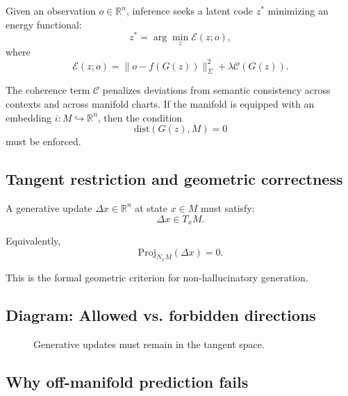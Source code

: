 \documentclass[11pt,a4paper,twocolumn]{article}
\begin{document}
Given an observation $o \in \mathbb{R}^n$, inference seeks a latent code
$z^\ast$ minimizing an energy functional:
\[
z^\ast = \arg\min_z \mathcal{E}(z; o),
\]
where
\[
\mathcal{E}(z; o) = \|o - f(G(z))\|^2_\Sigma
+ \lambda \mathcal{C}(G(z)).
\]

The coherence term $\mathcal{C}$ penalizes deviations from semantic
consistency across contexts and across manifold charts.  
If the manifold is equipped with an embedding $i : M \hookrightarrow
\mathbb{R}^n$, then the condition
\[
\mathrm{dist}(G(z), M) = 0
\]
must be enforced.

\subsection{Tangent restriction and geometric correctness}

A generative update $\Delta x \in \mathbb{R}^n$ at state $x \in M$ must
satisfy:
\[
\Delta x \in T_x M.
\]

Equivalently,
\[
\mathrm{Proj}_{N_x M} (\Delta x) = 0.
\]

This is the formal geometric criterion for non-hallucinatory generation.

\subsection{Diagram: Allowed vs. forbidden directions}

\begin{figure}[H]
\centering
{}
\caption{Generative updates must remain in the tangent space.}
\end{figure}

\subsection{Why off-manifold prediction fails}
\end{document}
